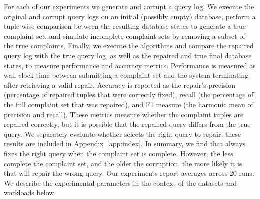 For each of our experiments we generate and corrupt a query log. 
We execute the original and corrupt query logs on an initial (possibly empty) database,
perform a tuple-wise comparison between the resulting database states to generate a true complaint set,
and simulate incomplete complaint sets by removing a subset of the true complaints.
Finally, we execute the algorithms and compare the repaired query log with the true query log, as well as the repaired and true
final database states, to measure performance and accuracy metrics.
Performance is measured as wall clock
time between submitting a complaint set and the system terminating after retrieving a valid repair.  
Accuracy is reported as the repair's precision (percentage of repaired tuples that were correctly fixed), 
recall (the percentage of the full complaint set that was repaired), 
and F1 measure (the harmonic mean of precision and recall). 
These metrics measure whether the complaint tuples are repaired correctly, but it is possible that the repaired query differs from the true query. 
We separately evaluate whether \sys selects the right query to repair; these results are included in Appendix~\ref{app:index}.  In summary, we find that \sys always fixes the right query when the complaint set is complete.  However, the less complete the complaint set, and the older the corruption, the more likely it is that \sys will repair the wrong query.
Our experiments report averages across 20 runs.
We describe the experimental parameters in the context of the datasets and workloads below. 




